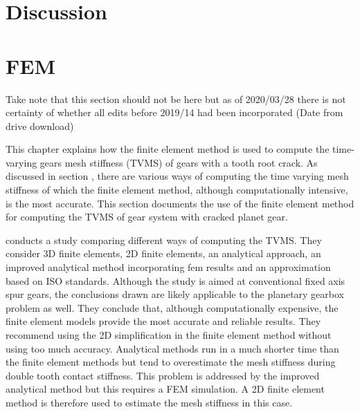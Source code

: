 
\chapter{Discussion}

\chapter{FEM}
Take note that this section should not be here but as of 2020/03/28 there is not certainty of whether all edits before 2019/14 had been incorporated (Date from drive download)

This chapter explains how the finite element method is used to compute the time-varying gears mesh stiffness (TVMS) of gears with a tooth root crack. As discussed in section \cite{not yet discussed}, there are various ways of computing the time varying mesh stiffness of which the finite element method, although computationally intensive, is the most accurate. This section documents the use of the finite element method for computing the TVMS of gear system with cracked planet gear.


\cite{Yu2017a} conducts a study comparing different ways of computing the TVMS. They consider 3D finite elements, 2D finite elements, an analytical approach, an improved analytical method incorporating fem results and an approximation based on ISO standards. Although the study is aimed at conventional fixed axis spur gears, the conclusions drawn are likely applicable to the planetary gearbox problem as well. They conclude that, although computationally expensive, the finite element models provide the most accurate and reliable results. They recommend using the 2D simplification in the finite element method without using too much accuracy. Analytical methods run in a much shorter time than the finite element methods but tend to overestimate the mesh stiffness during double tooth contact stiffness. This problem is addressed by the improved analytical method but this requires a FEM simulation. A 2D finite element method is therefore used to estimate the mesh stiffness in this case. 




